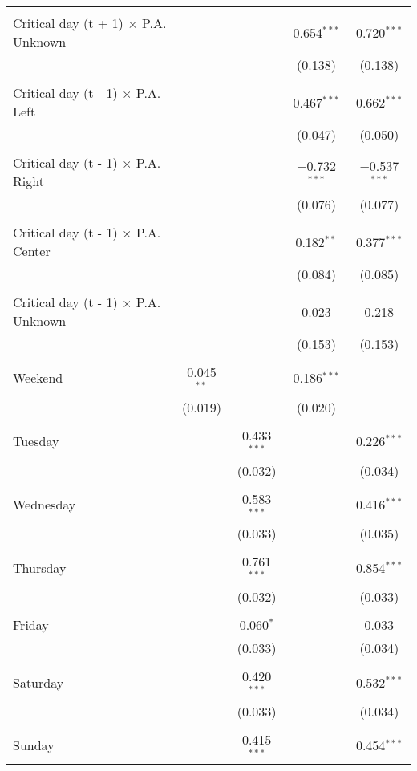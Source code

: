 \documentclass[
]{article}
\begin{document}
\begin{table}[!htbp]
{\begin{tabular}{@{\extracolsep{5pt}}lcccc}
  & & & & \\ 
 Critical day (t + 1) $\times$ P.A. Unknown &  &  & 0.654$^{***}$ & 0.720$^{***}$ \\ 
  &  &  & (0.138) & (0.138) \\ 
  & & & & \\ 
 Critical day (t - 1) $\times$ P.A. Left &  &  & 0.467$^{***}$ & 0.662$^{***}$ \\ 
  &  &  & (0.047) & (0.050) \\ 
  & & & & \\ 
 Critical day (t - 1) $\times$ P.A. Right &  &  & $-$0.732$^{***}$ & $-$0.537$^{***}$ \\ 
  &  &  & (0.076) & (0.077) \\ 
  & & & & \\ 
 Critical day (t - 1) $\times$ P.A. Center &  &  & 0.182$^{**}$ & 0.377$^{***}$ \\ 
  &  &  & (0.084) & (0.085) \\ 
  & & & & \\ 
 Critical day (t - 1) $\times$ P.A. Unknown &  &  & 0.023 & 0.218 \\ 
  &  &  & (0.153) & (0.153) \\ 
  & & & & \\ 
 Weekend & 0.045$^{**}$ &  & 0.186$^{***}$ &  \\ 
  & (0.019) &  & (0.020) &  \\ 
  & & & & \\ 
 Tuesday &  & 0.433$^{***}$ &  & 0.226$^{***}$ \\ 
  &  & (0.032) &  & (0.034) \\ 
  & & & & \\ 
 Wednesday &  & 0.583$^{***}$ &  & 0.416$^{***}$ \\ 
  &  & (0.033) &  & (0.035) \\ 
  & & & & \\ 
 Thursday &  & 0.761$^{***}$ &  & 0.854$^{***}$ \\ 
  &  & (0.032) &  & (0.033) \\ 
  & & & & \\ 
 Friday &  & 0.060$^{*}$ &  & 0.033 \\ 
  &  & (0.033) &  & (0.034) \\ 
  & & & & \\ 
 Saturday &  & 0.420$^{***}$ &  & 0.532$^{***}$ \\ 
  &  & (0.033) &  & (0.034) \\ 
  & & & & \\ 
 Sunday &  & 0.415$^{***}$ &  & 0.454$^{***}$ \\ 

\end{tabular}}
\end{table}
\end{document}

